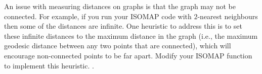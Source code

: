 \documentclass{article}
\begin{document}
An issue with measuring distances on graphs is that the graph may not be connected. For example, if you run your ISOMAP code with $2$-nearest neighbours then some of the distances are infinite. One heuristic to address this is to set these infinite distances to the maximum distance in the graph (i.e., the maximum geodesic distance between any two points that are connected), which will encourage non-connected points to be far apart. Modify your ISOMAP function to implement this heuristic. .

\end{document}
